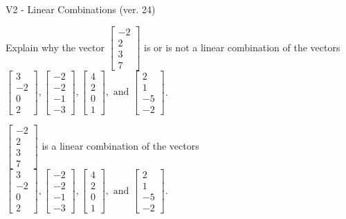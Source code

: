 \begin{exercise}
  \begin{exerciseTitle}V2 - Linear Combinations (ver. 24)\end{exerciseTitle}
  \begin{exerciseStatement}
    Explain why the vector \(\left[\begin{array}{c}
-2 \\
2 \\
3 \\
7
\end{array}\right]\)  is or is not a linear 
	combination of the vectors \(\left[\begin{array}{c}
3 \\
-2 \\
0 \\
2
\end{array}\right] , \left[\begin{array}{c}
-2 \\
-2 \\
-1 \\
-3
\end{array}\right] , \left[\begin{array}{c}
4 \\
2 \\
0 \\
1
\end{array}\right] , \text{ and } \left[\begin{array}{c}
2 \\
1 \\
-5 \\
-2
\end{array}\right]\).
	


  \end{exerciseStatement}
  \begin{exerciseAnswer}
   \(\left[\begin{array}{c}
-2 \\
2 \\
3 \\
7
\end{array}\right]\) 
  	 is  
	a linear combination of the vectors \(\left[\begin{array}{c}
3 \\
-2 \\
0 \\
2
\end{array}\right] , \left[\begin{array}{c}
-2 \\
-2 \\
-1 \\
-3
\end{array}\right] , \left[\begin{array}{c}
4 \\
2 \\
0 \\
1
\end{array}\right] , \text{ and } \left[\begin{array}{c}
2 \\
1 \\
-5 \\
-2
\end{array}\right]\).


\end{exerciseAnswer}
\end{exercise}
